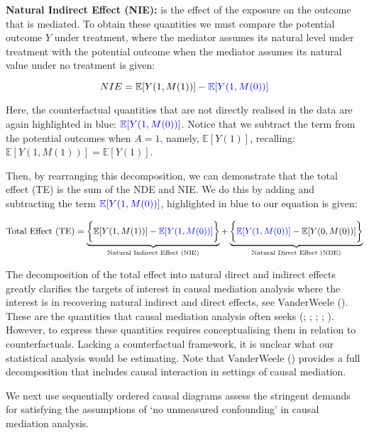 \documentclass[
  singlecolumn]{article}
\begin{document}
\textbf{Natural Indirect Effect (NIE):} is the effect of the exposure on
the outcome that is mediated. To obtain these quantities we must compare
the potential outcome \(Y\) under treatment, where the mediator assumes
its natural level under treatment with the potential outcome when the
mediator assumes its natural value under no treatment is given:

\[
 NIE = \mathbb{E}[Y(1, M(1))] - \textcolor{blue}{\mathbb{E}[Y(1, M(0))]}
\]

Here, the counterfactual quantities that are not directly realised in
the data are again highlighted in blue:
\(\textcolor{blue}{\mathbb{E}[Y(1, M(0))]}\). Notice that we subtract
the term from the potential outcomes when \(A=1\), namely,
\(\mathbb{E}[Y(1)]\), recalling:
\(\mathbb{E}[Y(1, M(1))] = \mathbb{E}[Y(1)]\).

Then, by rearranging this decomposition, we can demonstrate that the
total effect (TE) is the sum of the NDE and NIE. We do this by adding
and subtracting the term \(\textcolor{blue}{\mathbb{E}[Y(1, M(0))]}\),
highlighted in blue to our equation is given:

\[
\text{Total Effect (TE)} = \underbrace{\bigg\{\mathbb{E}[Y(1, M(1))] - \textcolor{blue}{\mathbb{E}[Y(1, M(0))]}\bigg\}}_{\text{Natural Indirect Effect (NIE)}} + \underbrace{\bigg\{\textcolor{blue}{\mathbb{E}[Y(1, M(0))]} - \mathbb{E}[Y(0, M(0))]\bigg\}}_{\text{Natural Direct Effect (NDE)}}
\]

The decomposition of the total effect into natural direct and indirect
effects greatly clarifies the targets of interest in causal mediation
analysis where the interest is in recovering natural indirect and direct
effects, see VanderWeele (). These
are the quantities that causal mediation analysis often seeks
(;
;
;
;
).
However, to express these quantities requires conceptualising them in
relation to counterfactuals. Lacking a counterfactual framework, it is
unclear what our statistical analysis would be estimating. Note that
VanderWeele () provides a full
decomposition that includes causal interaction in settings of causal
mediation.

We next use sequentially ordered causal diagrams assess the stringent
demands for satisfying the assumptions of `no unmeasured confounding' in
causal mediation analysis.
\end{document}
